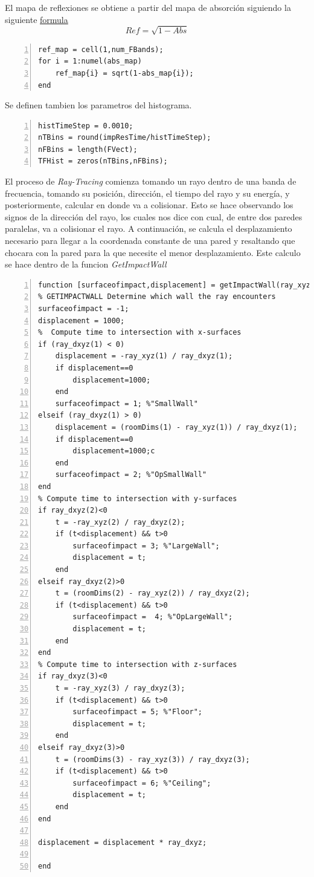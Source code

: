 El mapa de reflexiones se obtiene a partir del mapa de absorción siguiendo la siguiente \href{https://www.researchgate.net/publication/276288771_Scattering_in_Room_Acoustics_and_Related_Activities_in_ISO_and_AES}{formula}
\begin{displaymath}
    Ref = \sqrt{1-Abs}
\end{displaymath}
\begin{lstlisting}[frame=single,numbers=left, style=Matlab-editor, basicstyle=\tiny]
ref_map = cell(1,num_FBands);
for i = 1:numel(abs_map)
    ref_map{i} = sqrt(1-abs_map{i});
end
\end{lstlisting}
Se definen tambien los parametros del histograma.
\begin{lstlisting}[frame=single,numbers=left, style=Matlab-editor, basicstyle=\tiny]
histTimeStep = 0.0010;
nTBins = round(impResTime/histTimeStep);
nFBins = length(FVect);
TFHist = zeros(nTBins,nFBins);
\end{lstlisting}
El proceso de \textit{Ray-Tracing} comienza tomando un rayo dentro de una banda de frecuencia, tomando su posición, dirección, el tiempo del rayo y su energía, y posteriormente, calcular en donde va a colisionar. Esto se hace observando los signos de la dirección del rayo, los cuales nos dice con cual, de entre dos paredes paralelas, va a colisionar el rayo. A continuación, se calcula el desplazamiento necesario para llegar a la coordenada constante de una pared y resaltando que chocara con la pared para la que necesite el menor desplazamiento. Este calculo se hace dentro de la funcion \textit{GetImpactWall}
\begin{lstlisting}[frame=single,numbers=left, style=Matlab-editor, basicstyle=\tiny]
function [surfaceofimpact,displacement] = getImpactWall(ray_xyz,ray_dxyz,roomDims)
% GETIMPACTWALL Determine which wall the ray encounters
surfaceofimpact = -1;
displacement = 1000;
%  Compute time to intersection with x-surfaces
if (ray_dxyz(1) < 0)
    displacement = -ray_xyz(1) / ray_dxyz(1);
    if displacement==0
        displacement=1000;
    end
    surfaceofimpact = 1; %"SmallWall"
elseif (ray_dxyz(1) > 0)
    displacement = (roomDims(1) - ray_xyz(1)) / ray_dxyz(1);
    if displacement==0
        displacement=1000;c
    end
    surfaceofimpact = 2; %"OpSmallWall"
end
% Compute time to intersection with y-surfaces
if ray_dxyz(2)<0
    t = -ray_xyz(2) / ray_dxyz(2);
    if (t<displacement) && t>0
        surfaceofimpact = 3; %"LargeWall";
        displacement = t;
    end
elseif ray_dxyz(2)>0
    t = (roomDims(2) - ray_xyz(2)) / ray_dxyz(2);
    if (t<displacement) && t>0
        surfaceofimpact =  4; %"OpLargeWall";
        displacement = t;
    end
end
% Compute time to intersection with z-surfaces
if ray_dxyz(3)<0
    t = -ray_xyz(3) / ray_dxyz(3);
    if (t<displacement) && t>0
        surfaceofimpact = 5; %"Floor";
        displacement = t;
    end
elseif ray_dxyz(3)>0
    t = (roomDims(3) - ray_xyz(3)) / ray_dxyz(3);
    if (t<displacement) && t>0
        surfaceofimpact = 6; %"Ceiling";
        displacement = t;
    end
end

displacement = displacement * ray_dxyz;

end
\end{lstlisting}

